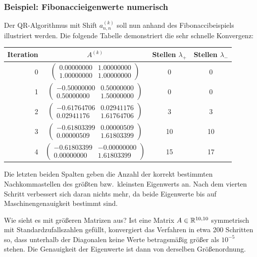 \subsubsection{Beispiel: Fibonaccieigenwerte numerisch}

Der QR-Algorithmus mit Shift $a^{(k)}_{n,n}$ soll nun anhand des
Fibonaccibeispiels illustriert werden. Die folgende Tabelle demonstriert die sehr schnelle Konvergenz:
\renewcommand{\arraystretch}{1.3}
\begin{longtable}[c]{r|c|c|c}
  Iteration & $A^{(k)}$ & Stellen $\lambda_+$ &  Stellen $\lambda_-$\\\hline\endhead
    0 & $\begin{pmatrix}
      0.00000000 &  1.00000000\\
      1.00000000 &  1.00000000
      \end{pmatrix}$
    & 0 & 0\\
    1 & $\begin{pmatrix}
      -0.50000000 &  0.50000000\\
      0.50000000 & 1.50000000
    \end{pmatrix}$
    & 0 & 0\\
    2 & $\begin{pmatrix}
      -0.61764706 &  0.02941176\\
      0.02941176 & 1.61764706
    \end{pmatrix}$
    & 3 & 3\\
    3 & $\begin{pmatrix}
      -0.61803399 &  0.00000509\\
      0.00000509 & 1.61803399
    \end{pmatrix}$
    & 10 & 10\\
    4 & $\begin{pmatrix}
      -0.61803399 & -0.00000000\\
      0.00000000 & 1.61803399
    \end{pmatrix}$ & 15 & 17
\end{longtable}
Die letzten beiden Spalten geben die Anzahl der korrekt bestimmten
Nachkommastellen des größten bzw.\ kleinsten Eigenwerts an. Nach dem
vierten Schritt verbessert sich daran nichts mehr, da beide Eigenwerte
bis auf Maschinengenauigkeit bestimmt sind.

Wie sieht es mit größeren Matrizen aus? Ist eine Matrix
$A\in\mathbb{R}^{10,10}$ symmetrisch mit Standardzufallszahlen gefüllt,
konvergiert das Verfahren in etwa 200 Schritten so, dass unterhalb der
Diagonalen keine Werte betragsmäßig größer als $10^{-5}$ stehen. Die Genauigkeit der Eigenwerte ist dann von derselben Größenordnung.

